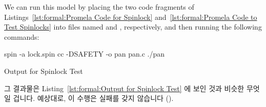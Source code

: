 We can run this model by placing the two code fragments of
Listings~\ref{lst:formal:Promela Code for Spinlock}
and~\ref{lst:formal:Promela Code to Test Spinlocks} into
files named  and , respectively, and then running
the following commands:

\fi

\begin{VerbatimU}
spin -a lock.spin
cc -DSAFETY -o pan pan.c
./pan
\end{VerbatimU}

\begin{listing}[htbp]
\vspace*{-9pt}
\caption{Output for Spinlock Test}
\label{lst:formal:Output for Spinlock Test}
\end{listing}

그 결과물은
Listing~\ref{lst:formal:Output for Spinlock Test}
에 보인 것과 비슷한 무엇일 겁니다.
예상대로, 이 수행은 실패를 갖지 않습니다 ().

\iffalse

The output will look something like that shown in
Listing~\ref{lst:formal:Output for Spinlock Test}.
As expected, this run has no assertion failures (\qco{errors: 0}).

\fi

